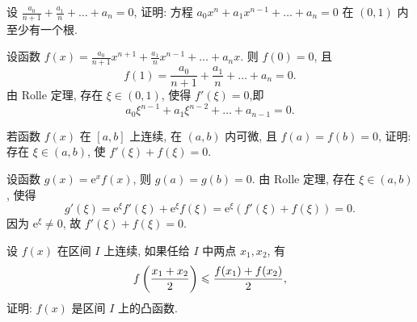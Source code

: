 \begin{exercise}[3.C.3]
    设 $\frac{a_0}{n+1} + \frac{a_1}{n} + \dots + a_n = 0$, 证明: 方程 $a_0 x^n + a_1 x^{n-1} + \dots + a_n = 0$ 在 $(0, 1)$ 内至少有一个根.
\end{exercise}

\begin{solution}
    设函数 $f(x) = \frac{a_0}{n+1} x^{n+1} + \frac{a_1}{n} x^{n-1} + \dots + a_n x$. 则 $f(0) = 0$, 且
    $$f(1) = \frac{a_0}{n+1} + \frac{a_1}{n} + \dots + a_n = 0.$$
    由 Rolle 定理, 存在 $\xi \in (0, 1)$, 使得 $f'(\xi) = 0$,即
    $$a_0 \xi^{n-1} + a_1 \xi^{n-2} + \dots + a_{n-1} = 0.$$
\end{solution}

\begin{exercise}[3.C.4]
    若函数 $f(x)$ 在 $[a, b]$ 上连续, 在 $(a, b)$ 内可微, 且 $f(a) = f(b) = 0$, 证明: 存在 $\xi \in (a, b)$, 使 $f'(\xi) + f(\xi) = 0$.
\end{exercise}

\begin{solution}
    设函数 $g(x) = \mathrm{e}^x f(x)$, 则 $g(a) = g(b) = 0$. 由 Rolle 定理, 存在 $\xi \in (a, b)$, 使得
    $$g'(\xi) = \mathrm{e}^\xi f'(\xi) + \mathrm{e}^\xi f(\xi) = \mathrm{e}^\xi (f'(\xi) + f(\xi)) = 0.$$
    因为 $\mathrm{e}^\xi \ne 0$, 故 $f'(\xi) + f(\xi) = 0$.
\end{solution}

\begin{exercise}[3.C.5]
    设 $f(x)$ 在区间 $I$ 上连续, 如果任给 $I$ 中两点 $x_1, x_2$, 有
    $$f\left(\frac{x_1 + x_2}{2}\right) \leqslant \frac{f(x_1) + f(x_2)}{2},$$
    证明: $f(x)$ 是区间 $I$ 上的凸函数.
\end{exercise}

